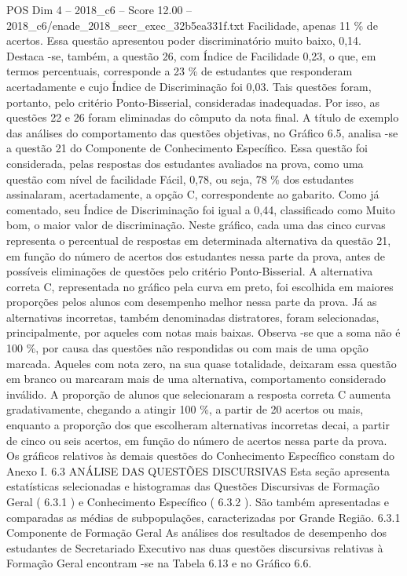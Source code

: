 \begin{textsample}{POS Dim 4 – 2018\_c6 – Score 12.00 – 2018\_c6/enade\_2018\_secr\_exec\_32b5ea331f.txt}
Facilidade, apenas 11 \% de acertos.
Essa questão apresentou poder discriminatório muito baixo, 0,14.
Destaca -se, também, a questão 26, com Índice de Facilidade 0,23, o que, em termos percentuais, corresponde a 23 \% de estudantes que responderam acertadamente e cujo Índice de Discriminação foi 0,03.
Tais questões foram, portanto, pelo critério Ponto-Bisserial, consideradas inadequadas.
Por isso, as questões 22 e 26 foram eliminadas do cômputo da nota final.
A título de exemplo das análises do comportamento das questões objetivas, no Gráfico 6.5, analisa -se a questão 21 do Componente de Conhecimento Específico.
Essa questão foi considerada, pelas respostas dos estudantes avaliados na prova, como uma questão com nível de facilidade Fácil, 0,78, ou seja, 78 \% dos estudantes assinalaram, acertadamente, a opção C, correspondente ao gabarito.
Como já comentado, seu Índice de Discriminação foi igual a 0,44, classificado como Muito bom, o maior valor de discriminação.
Neste gráfico, cada uma das cinco curvas representa o percentual de respostas em determinada alternativa da questão 21, em função do número de acertos dos estudantes nessa parte da prova, antes de possíveis eliminações de questões pelo critério Ponto-Bisserial.
A alternativa correta C, representada no gráfico pela curva em preto, foi escolhida em maiores proporções pelos alunos com desempenho melhor nessa parte da prova.
Já as alternativas incorretas, também denominadas distratores, foram selecionadas, principalmente, por aqueles com notas mais baixas.
Observa -se que a soma não é 100 \%, por causa das questões não respondidas ou com mais de uma opção marcada.
Aqueles com nota zero, na sua quase totalidade, deixaram essa questão em branco ou marcaram mais de uma alternativa, comportamento considerado inválido.
A proporção de alunos que selecionaram a resposta correta C aumenta gradativamente, chegando a atingir 100 \%, a partir de 20 acertos ou mais, enquanto a proporção dos que escolheram alternativas incorretas decai, a partir de cinco ou seis acertos, em função do número de acertos nessa parte da prova.
Os gráficos relativos às demais questões do Conhecimento Específico constam do Anexo I. 6.3 ANÁLISE DAS QUESTÕES DISCURSIVAS Esta seção apresenta estatísticas selecionadas e histogramas das Questões Discursivas de Formação Geral ( 6.3.1 ) e Conhecimento Específico ( 6.3.2 ).
São também apresentadas e comparadas as médias de subpopulações, caracterizadas por Grande Região. 6.3.1 Componente de Formação Geral As análises dos resultados de desempenho dos estudantes de Secretariado Executivo nas duas questões discursivas relativas à Formação Geral encontram -se na Tabela 6.13 e no Gráfico 6.6.

\end{textsample}
